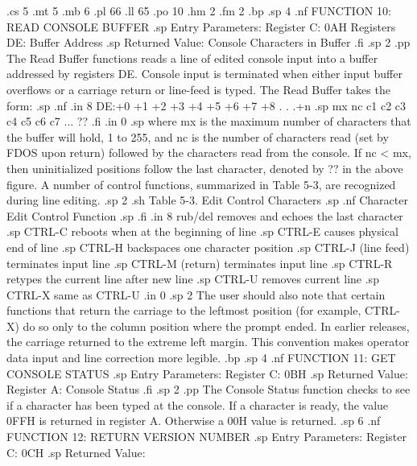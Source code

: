 .cs 5
.mt 5
.mb 6
.pl 66
.ll 65
.po 10
.hm 2
.fm 2
.bp
.sp 4
.nf
                FUNCTION 10:  READ CONSOLE BUFFER
.sp
                Entry Parameters:
                      Register C:  0AH
                    Registers DE:  Buffer Address
.sp
                Returned Value:
                     Console Characters in Buffer
.fi
.sp 2
.pp
The Read Buffer functions reads a line of edited console input 
into a buffer addressed by registers DE.  Console input is 
terminated when either input buffer overflows or a carriage return 
or line-feed is typed.  The Read Buffer takes the form:
.sp 
.nf
.in 8
DE:+0 +1 +2 +3 +4 +5 +6 +7 +8 . . .+n
.sp
mx nc c1 c2 c3 c4 c5 c6 c7  ... ??
.fi
.in 0
.sp 
where mx is the maximum number of characters that the buffer will 
hold, 1 to 255, and nc is the number of characters read (set by 
FDOS upon return) followed by the characters read from the 
console.  If nc < mx, then uninitialized positions follow the 
last character, denoted by ?? in the above figure.  A number of 
control functions, summarized in Table 5-3, are recognized during 
line editing.
.sp 2
.sh
               Table 5-3.  Edit Control Characters
.sp
.nf
       Character             Edit Control Function
.sp
.fi
.in 8
rub/del     removes and echoes the last character
.sp
CTRL-C      reboots when at the beginning of line
.sp
CTRL-E      causes physical end of line
.sp
CTRL-H      backspaces one character position
.sp
CTRL-J      (line feed) terminates input line
.sp
CTRL-M      (return) terminates input line
.sp
CTRL-R      retypes the current line after new line
.sp
CTRL-U      removes current line
.sp
CTRL-X      same as CTRL-U
.in 0
.sp 2
The user should also note that certain functions that return the 
carriage to the leftmost position (for example, CTRL-X) do so only to the 
column position where the prompt ended.  In earlier releases, the 
carriage returned to the extreme left margin.  This convention 
makes operator data input and line correction more legible.
.bp
.sp 4
.nf
                FUNCTION 11:  GET CONSOLE STATUS
.sp
                Entry Parameters:
                      Register C:  0BH
.sp
                Returned Value:
                      Register A:  Console Status
.fi
.sp 2
.pp
The Console Status function checks to see if a character has been 
typed at the console.  If a character is ready, the value 0FFH is 
returned in register A.  Otherwise a 00H value is returned.
.sp 6
.nf
               FUNCTION 12:  RETURN VERSION NUMBER
.sp
               Entry Parameters:
                     Register C:  0CH
.sp
               Returned Value:
